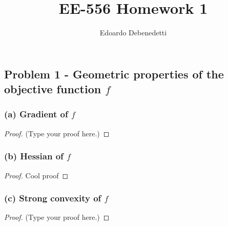 \documentclass[12pt]{article}
\title{EE-556 Homework 1}
\author{Edoardo Debenedetti}
\begin{document}
\maketitle

\vspace{0.5in}



\subsection*{Problem 1 - Geometric properties of the objective function $f$}
\subsubsection*{(a) Gradient of $f$}

\begin{proof}
(Type your proof here.)
\end{proof}

\subsubsection*{(b) Hessian of $f$}
\begin{proof}
Cool proof
\end{proof}

\subsubsection*{(c) Strong convexity of $f$}
\begin{proof}
(Type your proof here.)
\end{proof}
\end{document}
